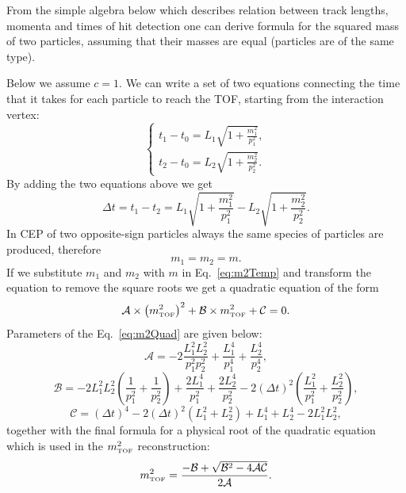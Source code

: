 From the simple algebra below which describes relation between track lengths, momenta and times of hit detection one can derive formula for the squared mass of two particles, assuming that their masses are equal (particles are of the same type).

Below we assume $c=1$. We can write a set of two equations connecting the time that it takes for each particle to reach the TOF, starting from the interaction vertex:
\begin{equation}
 \left\{\begin{array}{l}%
 t_{1}-t_{0} = L_{1}\sqrt{1+\frac{m_{1}^{2}}{p_{1}^{2}}}, \\[3pt]
 t_{2}-t_{0} = L_{2}\sqrt{1+\frac{m_{2}^{2}}{p_{2}^{2}}}.
\end{array}\right.%
\end{equation}
By adding the two equations above we get
\begin{equation}\label{eq:m2Temp}
 \Delta t = t_{1}-t_{2} = L_{1}\sqrt{1+\frac{m_{1}^{2}}{p_{1}^{2}}} - L_{2}\sqrt{1+\frac{m_{2}^{2}}{p_{2}^{2}}}.
\end{equation}
In CEP of two opposite-sign particles always the same species of particles are produced, therefore
\begin{equation}m_{1}=m_{2}=m.\end{equation}
If we substitute $m_{1}$ and $m_{2}$ with $m$ in Eq.~\eqref{eq:m2Temp} and transform the equation to remove the square roots we get a quadratic equation of the form 
\begin{equation}\label{eq:m2Quad}\mathcal{A}\times \left(m^{2}_{\text{\tiny TOF}}\right)^{2} + \mathcal{B}\times m^{2}_{\text{\tiny TOF}} + \mathcal{C} = 0.\end{equation}
Parameters of the Eq.~\eqref{eq:m2Quad} are given below:
\begin{equation}
\mathcal{A}= -2\frac{L^2_1L^2_2}{p^2_1p^2_2}+\frac{L^4_1}{p^4_1}+\frac{L^4_2}{p^4_2},
\end{equation}
\begin{equation}
\mathcal{B}=-2L^2_1L^2_2\left({\frac{1}{p^2_1}} + {\frac{1}{p^2_2}}\right)+\frac{2L^4_1}{p_1^2}+\frac{2L^4_2}{p_2^2}-2\left(\Delta t\right)^2\left(\frac{L^2_1}{p_1^2}+\frac{L^2_2}{p_2^2}\right),
\end{equation}
\begin{equation}
\mathcal{C}=\left(\Delta t\right)^4-2\left(\Delta t\right)^2\left(L^2_1+L^2_2\right)+L^4_1+L^4_2-2L^2_1L^2_2,
\end{equation}
together with the final formula for a physical root of the quadratic equation which is used in the $m^{2}_{\text{\tiny TOF}}$ reconstruction:
\begin{equation}
 \label{eq:mSquared}
m^{2}_{\text{\tiny TOF}} = \frac{-\mathcal{B}+\sqrt{\mathcal{B}^2-4\mathcal{A}\mathcal{C}}}{2\mathcal{A}}.
\end{equation}
